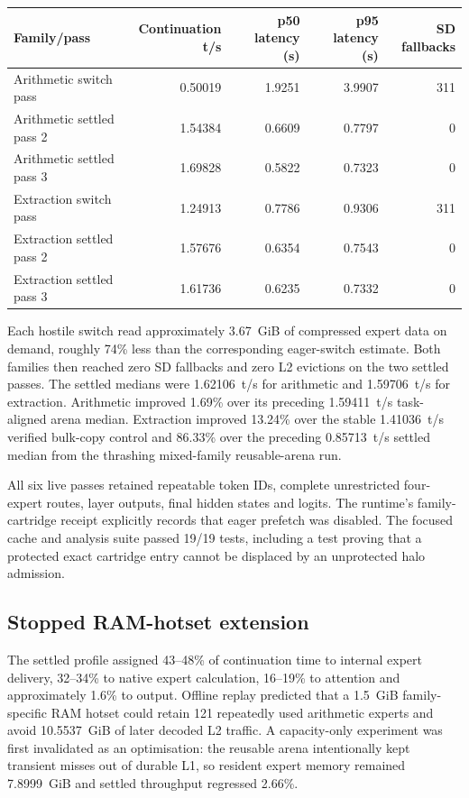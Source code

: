 \begin{center}
\begin{tabular}{lrrrr}
\toprule
Family/pass & Continuation t/s & p50 latency (s) & p95 latency (s) & SD fallbacks \\
\midrule
Arithmetic switch pass & 0.50019 & 1.9251 & 3.9907 & 311 \\
Arithmetic settled pass 2 & 1.54384 & 0.6609 & 0.7797 & 0 \\
Arithmetic settled pass 3 & 1.69828 & 0.5822 & 0.7323 & 0 \\
Extraction switch pass & 1.24913 & 0.7786 & 0.9306 & 311 \\
Extraction settled pass 2 & 1.57676 & 0.6354 & 0.7543 & 0 \\
Extraction settled pass 3 & 1.61736 & 0.6235 & 0.7332 & 0 \\
\bottomrule
\end{tabular}
\end{center}

Each hostile switch read approximately 3.67~GiB of compressed expert data on
demand, roughly 74\% less than the corresponding eager-switch estimate.  Both
families then reached zero SD fallbacks and zero L2 evictions on the two
settled passes.  The settled medians were 1.62106~t/s for arithmetic and
1.59706~t/s for extraction.  Arithmetic improved 1.69\% over its preceding
1.59411~t/s task-aligned arena median.  Extraction improved 13.24\% over the
stable 1.41036~t/s verified bulk-copy control and 86.33\% over the preceding
0.85713~t/s settled median from the thrashing mixed-family reusable-arena run.

All six live passes retained repeatable token IDs, complete unrestricted
four-expert routes, layer outputs, final hidden states and logits.  The
runtime's family-cartridge receipt explicitly records that eager prefetch was
disabled.  The focused cache and analysis suite passed 19/19 tests, including
a test proving that a protected exact cartridge entry cannot be displaced by
an unprotected halo admission.

\subsection{Stopped RAM-hotset extension}

The settled profile assigned 43--48\% of continuation time to internal expert
delivery, 32--34\% to native expert calculation, 16--19\% to attention and
approximately 1.6\% to output.  Offline replay predicted that a 1.5~GiB
family-specific RAM hotset could retain 121 repeatedly used arithmetic experts
and avoid 10.5537~GiB of later decoded L2 traffic.  A capacity-only experiment
was first invalidated as an optimisation: the reusable arena intentionally
kept transient misses out of durable L1, so resident expert memory remained
7.8999~GiB and settled throughput regressed 2.66\%.

